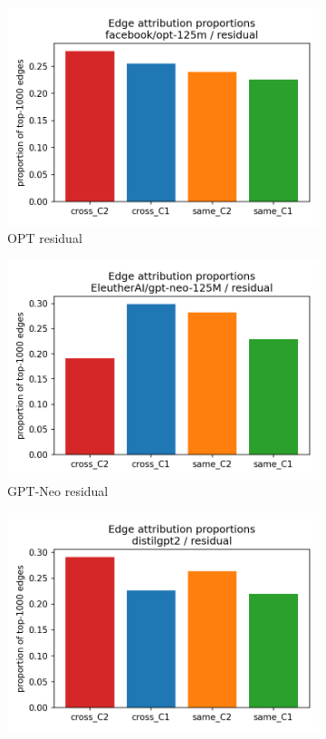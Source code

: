 \documentclass[11pt]{article}
\newcommand{\1}{\mathbf{1}}
\begin{document}
\begin{figure}[t]
\centering
\begin{subfigure}[t]{0.32\textwidth}
\includegraphics[width=\linewidth]{figs/edge_attr_props_facebook_opt-125m_residual.png}
\caption{OPT residual}
\end{subfigure}\hfill
\begin{subfigure}[t]{0.32\textwidth}
\includegraphics[width=\linewidth]{figs/edge_attr_props_EleutherAI_gpt-neo-125M_residual.png}
\caption{GPT-Neo residual}
\end{subfigure}\hfill
\begin{subfigure}[t]{0.32\textwidth}
\includegraphics[width=\linewidth]{figs/edge_attr_props_distilgpt2_residual.png}

\end{subfigure}
\end{figure}
\end{document}
